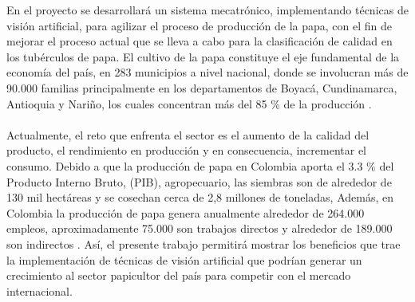En el proyecto se desarrollará un sistema mecatrónico, implementando técnicas de visión artificial, para agilizar el proceso de producción de la papa, con el fin de mejorar el proceso actual que se lleva a cabo para la clasificación de calidad en los tubérculos de papa. El cultivo de la papa constituye el eje fundamental de la economía del país, en 283 municipios a nivel nacional, donde se involucran más de 90.000 familias principalmente en los departamentos de Boyacá, Cundinamarca, Antioquia y Nariño, los cuales concentran más del 85 \% de la producción \cite{referencia1}.
\\
\\
Actualmente, el reto que enfrenta el sector es el aumento de la calidad del producto, el rendimiento en producción y en consecuencia, incrementar el consumo. Debido a que la producción de papa en Colombia aporta el 3.3 \% del Producto Interno Bruto, (PIB), agropecuario, las siembras son de alrededor de 130 mil hectáreas y se cosechan cerca de 2,8 millones de toneladas, Además, en Colombia la producción de papa genera anualmente alrededor de 264.000 empleos, aproximadamente 75.000 son trabajos directos y alrededor de 189.000 son indirectos \cite{referencia2}.
Así, el presente trabajo permitirá mostrar los beneficios que trae la implementación de técnicas de visión artificial que podrían generar un crecimiento al sector papicultor del país para competir con el mercado internacional.


